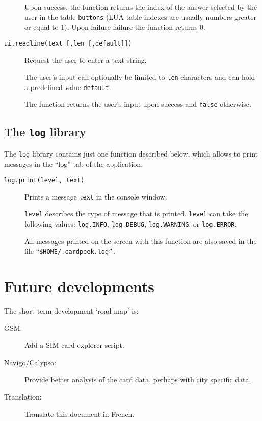 \documentclass[11pt]{article}
\begin{document}
\begin{description}
{  Upon success, the function returns the index of the answer selected by the 
  user in the table \texttt{buttons} 
  (LUA table indexes are usually numbers greater or equal to 1). 
  Upon failure failure the function returns 0.
}

\item[\texttt{ui.readline(text [,len [,default]])}]
{
  Request the user to enter a text string. 

  The user's input can optionally be limited to \texttt{len} characters and 
  can hold a predefined value \texttt{default}.
  
  The function returns the user's input upon success and \texttt{false} otherwise.
}

\end{description}

\subsection{The \texttt{log} library}

The \texttt{log} library contains just one function described below, which allows to print messages in the ``log'' tab of the application.

\begin{description}

\item[\texttt{log.print(level, text)}]
{
  Prints a message \texttt{text} in the console window.

  \texttt{level} describes the type of message that is printed. 
  \texttt{level} can take the following values: \texttt{log.INFO}, 
  \texttt{log.DEBUG}, \texttt{log.WARNING}, or \texttt{log.ERROR}.}

  All messages printed on the screen with this function are also 
  saved in the file ``\texttt{\$HOME/.cardpeek.log''.
}

\end{description}

\section{Future developments}

The short term development `road map' is:
\begin{description}
\item[GSM:]{Add a SIM card explorer script.}
\item[Navigo/Calypso:]{Provide better analysis of the card data, perhaps with city specific data.}
\item[Translation:]{Translate this document in French.}
\end{description}
\end{document}
